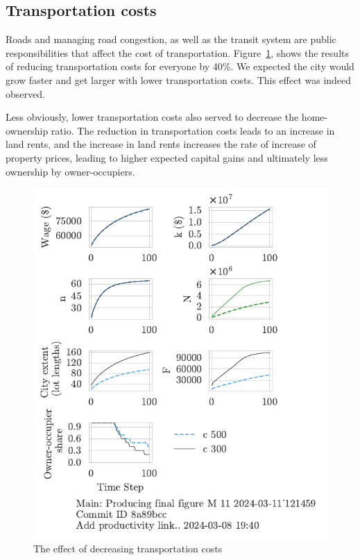 \newpage
\subsection{Transportation costs}
Roads and managing road congestion, as well as the transit system are public responsibilities that affect the cost of transportation. %
Figure~\ref{fig:c_ownership_trajectory}, shows the results of reducing transportation costs for everyone by 40\%. 
We expected the city would grow faster and get larger with lower transportation costs. This effect was indeed observed. 

Less obviously, lower transportation costs also served to decrease the home-ownership ratio. The reduction in transportation costs leads to an increase in land rents, and the increase in land rents increases the rate of increase of property prices, leading to higher expected capital gains and ultimately less ownership by owner-occupiers. 

\begin{figure}[h!t]
    \centering
    \includegraphics[scale=1, trim={0 1.4cm 0 0},clip]{fig/c-Main-121459.pdf}
    \caption{The effect of decreasing transportation costs}
    \label{fig:c_ownership_trajectory}
\end{figure}

